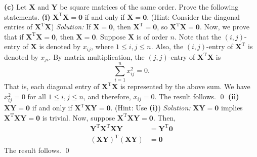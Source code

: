 \documentclass{article}
\begin{document}
\newline
\newline\textbf{(c)} Let $\mathbf{X}$ and $\mathbf{Y}$ be square matrices of the same order. Prove the following statements.
\newline
\newline\textbf{(i)} $\mathbf{X}^\text{T}\mathbf{X}=\mathbf{0}$ if and only if $\mathbf{X}=\mathbf{0}$. (Hint: Consider the diagonal entries of $\mathbf{X}^\text{T}\mathbf{X}$)
\newline
\newline\textit{Solution:} If $\mathbf{X}=\mathbf{0}$, then $\mathbf{X}^\text{T}=\mathbf{0}$, so $\mathbf{X}^\text{T}\mathbf{X}=\mathbf{0}$.
\newline
\newline Now, we prove that if $\mathbf{X}^\text{T}\mathbf{X}=\mathbf{0}$, then $\mathbf{X}=\mathbf{0}$. Suppose $\mathbf{X}$ is of order $n$. Note that the $(i,j)$-entry of $\mathbf{X}$ is denoted by $x_{ij}$, where $1 \le i,j \le n$. Also, the $(i,j)$-entry of $\mathbf{X}^\text{T}$ is denoted by $x_{ji}$. By matrix multiplication, the $(j,j)$-entry of $\mathbf{X}^\text{T}\mathbf{X}$ is \[\sum_{i=1}^{n}x_{ij}^2=0.\] That is, each diagonal entry of $\mathbf{X}^\text{T}\mathbf{X}$ is represented by the above sum. We have $x_{ij}^2=0$ for all $1 \le i,j \le n$, and therefore, $x_{ij}=0$. The result follows. \qed 
\newline
\newline\textbf{(ii)} $\mathbf{XY}=\mathbf{0}$ if and only if $\mathbf{X}^\text{T}\mathbf{XY}=\mathbf{0}$. (Hint: Use \textbf{(i)})
\newline
\newline\textit{Solution:} $\mathbf{XY}=\mathbf{0}$ implies $\mathbf{X}^\text{T}\mathbf{XY}=\mathbf{0}$ is trivial.
\newline
\newline Now, suppose $\mathbf{X}^\text{T}\mathbf{XY}=\mathbf{0}$. Then, \begin{align*}
    \mathbf{Y}^\text{T}\mathbf{X}^\text{T}\mathbf{XY}&=\mathbf{Y}^\text{T}\mathbf{0}\\
    (\mathbf{X}\mathbf{Y})^\text{T}(\mathbf{XY})&=\mathbf{0}
\end{align*}
The result follows. \qed 
\newpage
\end{document}

